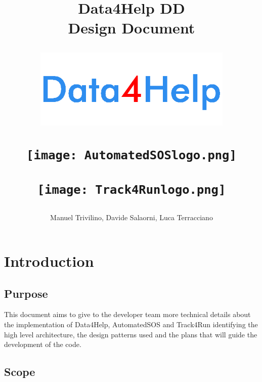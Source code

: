 \documentclass[a4paper]{article}
\begin{document}
\author{Manuel Trivilino, Davide Salaorni, Luca Terracciano}

\title{\Large \textbf{Data4Help DD}\\
\textbf{Design Document}
    \begin{figure}[h]
        \centering
        \includegraphics[width=270pt]{data4helpblu}
        \label{fig:my_label_1}
    \end{figure}
    \vspace{-2.4cm}
    \begin{figure}[h]
        \centering
        \texttt{[image: AutomatedSOSlogo.png]}
        \label{fig:my_label_2}
    \end{figure}
    \vspace{-2cm}
    \begin{figure}[h]
        \centering
        \texttt{[image: Track4Runlogo.png]}
        \label{fig:my_label_3}
\end{figure}
}

\maketitle
\newpage

\tableofcontents
\newpage

\section{Introduction}

\subsection{Purpose}
This document aims to give to the developer team more technical details about the implementation of Data4Help, AutomatedSOS and Track4Run identifying the high level architecture, the design patterns used and the plans that will guide the development of the code.

\subsection{Scope}
\end{document}
